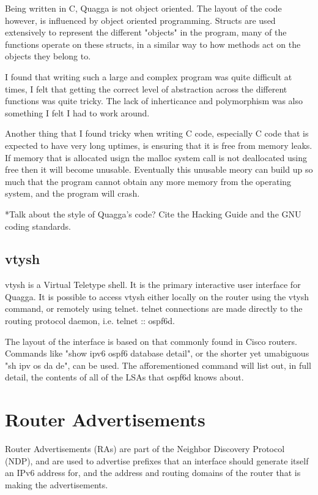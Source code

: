 \documentclass[12pt]{report}
\begin{document}
Being written in C, Quagga is not object oriented. The layout of the code 
however, is influenced by object oriented programming. Structs are used 
extensively to represent the different "objects" in the program, many of the 
functions operate on these structs, in a similar way to how methods act on the 
objects they belong to.

I found that writing such a large and complex program was quite difficult at 
times, I felt that getting the correct level of abstraction across the different 
functions was quite tricky. The lack of inherticance and polymorphism was also 
something I felt I had to work around. 

Another thing that I found tricky when writing C code, especially C code that is 
expected to have very long uptimes, is ensuring that it is free from memory leaks. 
If memory that is allocated usign the malloc system call is not deallocated using 
free then it will become unusable. Eventually this unusable meory can build up so 
much that the program cannot obtain any more memory from the operating system, and 
the program will crash.

*Talk about the style of Quagga's code?
Cite the Hacking Guide and the GNU coding standards.

\subsection{vtysh}
vtysh  is a Virtual 
Teletype shell. It is the primary interactive user interface for Quagga. It is 
possible to access vtysh either locally on the router using the vtysh command, 
or remotely using telnet. telnet connections are made directly to the routing 
protocol daemon, i.e. telnet :: ospf6d.  

The layout of the interface is based on that commonly found in Cisco routers. 
Commands like "show ipv6 ospf6 database detail", or the shorter yet umabiguous 
"sh ipv os da de", can be used. The afforementioned command will list out, in 
full detail, the contents of all of the LSAs that ospf6d knows about. 

\section{Router Advertisements}
Router Advertisements (RAs)  
are part of the Neighbor Discovery Protocol (NDP), 
 and are used to 
advertise prefixes that an interface should generate itself an IPv6 
address for, and the address and routing domains of the router that is 
making the advertisements. 
\end{document}
